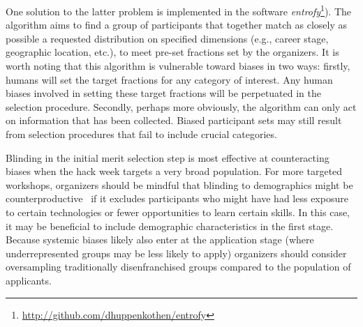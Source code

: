 One solution to the latter problem is implemented in the software \textit{entrofy}\footnote{\url{http://github.com/dhuppenkothen/entrofy}}).
The algorithm aims to find a group of participants that together match as closely as possible a requested distribution on specified dimensions (e.g., career stage, geographic location, etc.), to meet pre-set fractions set by the organizers.
It is worth noting that this algorithm is vulnerable toward biases in two ways: firstly, humans will set the target fractions for any category of interest.
Any human biases involved in setting these target fractions will be perpetuated in the selection procedure.
Secondly, perhaps more obviously, the algorithm can only act on information that has been collected.
Biased participant sets may still result from selection procedures that fail to include crucial categories. %

Blinding in the initial merit selection step is most effective at counteracting biases when the hack week targets a very broad population.
For more targeted workshops, organizers should be mindful that blinding to demographics might be counterproductive~\cite{behaghel2015unintended} if it excludes participants who might have had less exposure to certain technologies or fewer opportunities to learn certain skills.
In this case, it may be beneficial to include demographic characteristics in the first stage.
Because systemic biases likely also enter at the application stage (where underrepresented groups may be less likely to apply) organizers should consider oversampling traditionally disenfranchised groups compared to the population of applicants.

